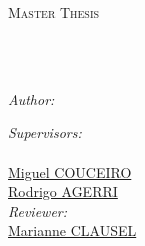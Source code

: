 \documentclass[
11pt, %
english, %
singlespacing, %
headsepline, %
]{Control/UL_control/UL_utils/MasterDoctoralThesis} %
\author{Luis Antonio \textsc{VASQUEZ REINA}} %
\begin{document}
\frontmatter %

\pagestyle{plain} %






\begin{titlepage}
\begin{center}

\vspace*{.06\textheight}
{\scshape\LARGE \univname\par}\vspace{1.5cm} %
\textsc{\Large Master Thesis}\\[0.5cm] %

\HRule \\[0.4cm] %
{\huge \bfseries \ttitle\par}\vspace{0.4cm} %
\HRule \\[1.5cm] %
 
\begin{minipage}[t]{0.5\textwidth}
\begin{flushleft} \large
\emph{Author:}\\
\href{http://www.johnsmith.com}{\authorname} %
\end{flushleft}
\end{minipage}
\begin{minipage}[t]{0.4\textwidth}
\begin{flushright} \large
\emph{Supervisors:} \\
\href{https://maiage.inrae.fr/fr/robert-bossy}{\supname}\\ %
\href{https://members.loria.fr/mcouceiro/}{Miguel COUCEIRO}\\
\href{https://ragerri.github.io/}{Rodrigo AGERRI}\\
\emph{Reviewer:}\\
\href{https://sites.google.com/site/marianneclausel/}{Marianne CLAUSEL}


\end{flushright}
\end{minipage}
\end{center}
\end{titlepage}
\end{document}
